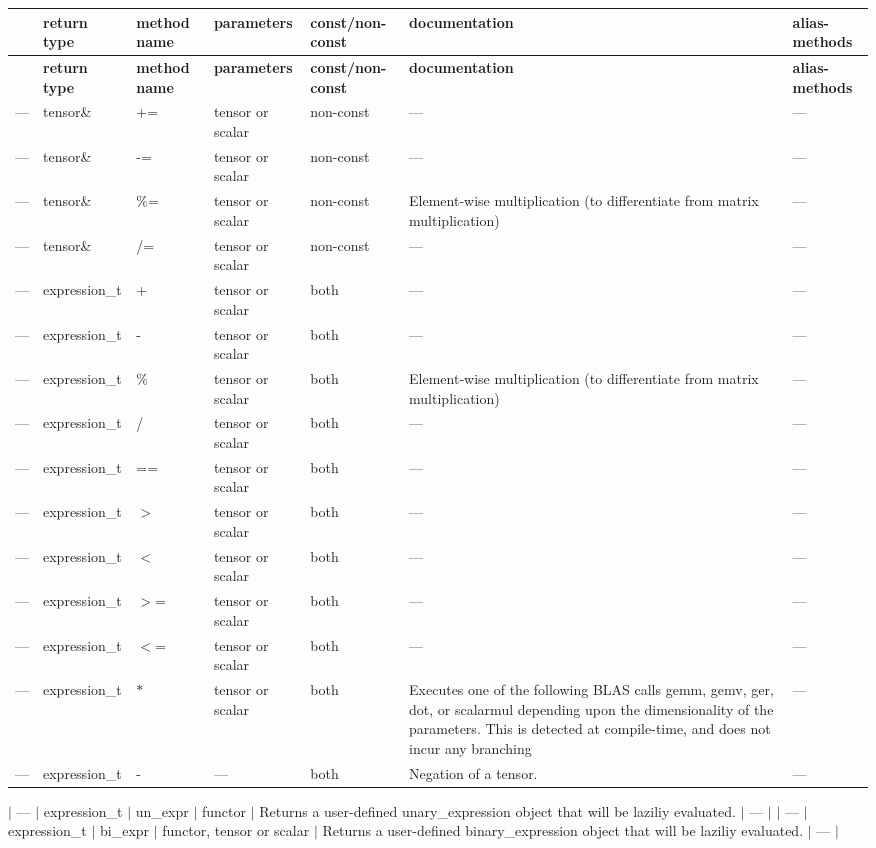 \tabulinesep=1mm
\begin{longtabu} spread 0pt [c]{*7{|X[-1]}|}
\hline
{}&{\bf return type }&{\bf method name }&{\bf parameters }&{\bf const/non-\/const }&{\bf documentation }&{\bf alias-\/methods  }\\
\endfirsthead
\hline
\endfoot
\hline
{}&{\bf return type }&{\bf method name }&{\bf parameters }&{\bf const/non-\/const }&{\bf documentation }&{\bf alias-\/methods  }\\
\endhead
--- &tensor\& &+= &tensor or scalar &non-\/const &--- &--- \\
--- &tensor\& &-\/= &tensor or scalar &non-\/const &--- &--- \\
--- &tensor\& &\%= &tensor or scalar &non-\/const &Element-\/wise multiplication (to differentiate from matrix multiplication) &--- \\
--- &tensor\& &/= &tensor or scalar &non-\/const &--- &--- \\
--- &expression\+\_\+t &+ &tensor or scalar &both &--- &--- \\
--- &expression\+\_\+t &-\/ &tensor or scalar &both &--- &--- \\
--- &expression\+\_\+t &\% &tensor or scalar &both &Element-\/wise multiplication (to differentiate from matrix multiplication) &--- \\
--- &expression\+\_\+t &/ &tensor or scalar &both &--- &--- \\
--- &expression\+\_\+t &== &tensor or scalar &both &--- &--- \\
--- &expression\+\_\+t &$>$ &tensor or scalar &both &--- &--- \\
--- &expression\+\_\+t &$<$ &tensor or scalar &both &--- &--- \\
--- &expression\+\_\+t &$>$= &tensor or scalar &both &--- &--- \\
--- &expression\+\_\+t &$<$= &tensor or scalar &both &--- &--- \\
--- &expression\+\_\+t &$\ast$ &tensor or scalar &both &Executes one of the following B\+L\+AS calls gemm, gemv, ger, dot, or scalarmul depending upon the dimensionality of the parameters. This is detected at compile-\/time, and does not incur any branching &--- \\
--- &expression\+\_\+t &-\/ &--- &both &Negation of a tensor. &--- \\
\end{longtabu}
$\vert$ --- $\vert$ expression\+\_\+t $\vert$ un\+\_\+expr $\vert$ functor $\vert$ Returns a user-\/defined unary\+\_\+expression object that will be laziliy evaluated. $\vert$ --- $\vert$ $\vert$ --- $\vert$ expression\+\_\+t $\vert$ bi\+\_\+expr $\vert$ functor, tensor or scalar $\vert$ Returns a user-\/defined binary\+\_\+expression object that will be laziliy evaluated. $\vert$ --- $\vert$

